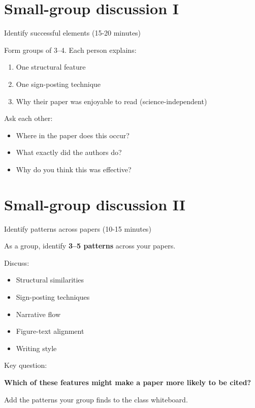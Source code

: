 \documentclass{beamer}
\begin{document}
\section{Small-group discussion I}
\begin{frame}{Identify successful elements (15-20 minutes)}

Form groups of 3–4.
Each person explains:

\begin{enumerate}
\item One structural feature
\item One sign-posting technique
\item Why their paper was enjoyable to read (science-independent)
\end{enumerate}

\vspace{0.5cm}

Ask each other:

\begin{itemize}
\item Where in the paper does this occur?
\item What exactly did the authors do?
\item Why do you think this was effective?
\end{itemize}

\end{frame}

\section{Small-group discussion II}
\begin{frame}{Identify patterns across papers (10-15 minutes)}

As a group, identify \textbf{3–5 patterns} across your papers.

Discuss:

\begin{itemize}
\item Structural similarities
\item Sign-posting techniques
\item Narrative flow
\item Figure-text alignment
\item Writing style
\end{itemize}

\vspace{0.5cm}

Key question:

\textbf{Which of these features might make a paper more likely to be cited?}

\vspace{0.5cm}
Add the patterns your group finds to the class whiteboard.

\end{frame}
\end{document}
